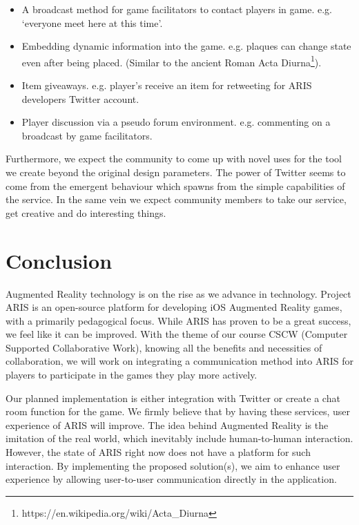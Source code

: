 \documentclass{sigchi}
\begin{document}
\begin{itemize}
  \item A broadcast method for game facilitators to contact players in game. e.g. ‘everyone meet here at this time’.
  \item Embedding dynamic information into the game. e.g. plaques can change state even after being placed. (Similar to the ancient Roman Acta Diurna\footnote{https://en.wikipedia.org/wiki/Acta\_Diurna}).
  \item Item giveaways. e.g. player’s receive an item for retweeting for ARIS developers Twitter account.
  \item Player discussion via a pseudo forum environment. e.g. commenting on a broadcast by game facilitators.
\end{itemize}

Furthermore, we expect the community to come up with novel uses for the tool we create beyond the original design parameters. The power of Twitter seems to come from the emergent behaviour which spawns from the simple capabilities of the service. In the same vein we expect community members to take our service, get creative and do interesting things.

\section{Conclusion}

Augmented Reality technology is on the rise as we advance in technology. Project ARIS is an open-source platform for developing iOS Augmented Reality games, with a primarily pedagogical focus. While ARIS has proven to be a great success, we feel like it can be improved. With the theme of our course CSCW (Computer Supported Collaborative Work), knowing all the benefits and necessities of collaboration, we will work on integrating a communication method into ARIS for players to participate in the games they play more actively.  

Our planned implementation is either integration with Twitter or create a chat room function for the game. We firmly believe that by having these services, user experience of ARIS will improve. The idea behind Augmented Reality is the imitation of the real world, which inevitably include human-to-human interaction. However, the state of ARIS right now does not have a platform for  such interaction. By implementing the proposed solution(s), we aim to enhance user experience by allowing user-to-user communication directly in the application.
\end{document}
